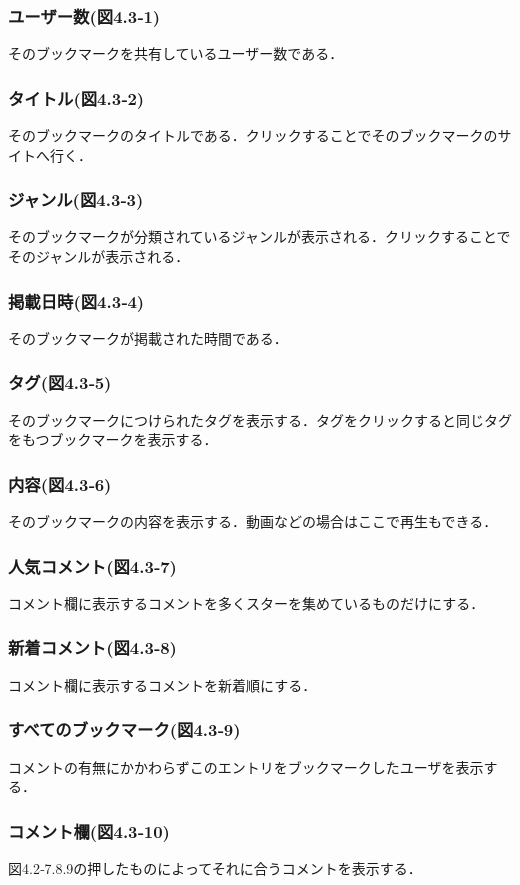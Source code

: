 \subsubsection{ユーザー数(図4.3‐1)}
そのブックマークを共有しているユーザー数である．
\subsubsection{タイトル(図4.3‐2)}
そのブックマークのタイトルである．クリックすることでそのブックマークのサイトへ行く．
\subsubsection{ジャンル(図4.3‐3)}
そのブックマークが分類されているジャンルが表示される．クリックすることでそのジャンルが表示される．
\subsubsection{掲載日時(図4.3‐4)}
そのブックマークが掲載された時間である．
\subsubsection{タグ(図4.3‐5)}
そのブックマークにつけられたタグを表示する．タグをクリックすると同じタグをもつブックマークを表示する．
\subsubsection{内容(図4.3‐6)}
そのブックマークの内容を表示する．動画などの場合はここで再生もできる．
\subsubsection{人気コメント(図4.3‐7)}
コメント欄に表示するコメントを多くスターを集めているものだけにする．
\subsubsection{新着コメント(図4.3‐8)}
コメント欄に表示するコメントを新着順にする．
\subsubsection{すべてのブックマーク(図4.3‐9)}
コメントの有無にかかわらずこのエントリをブックマークしたユーザを表示する．
\subsubsection{コメント欄(図4.3‐10)}
図4.2‐7.8.9の押したものによってそれに合うコメントを表示する．

